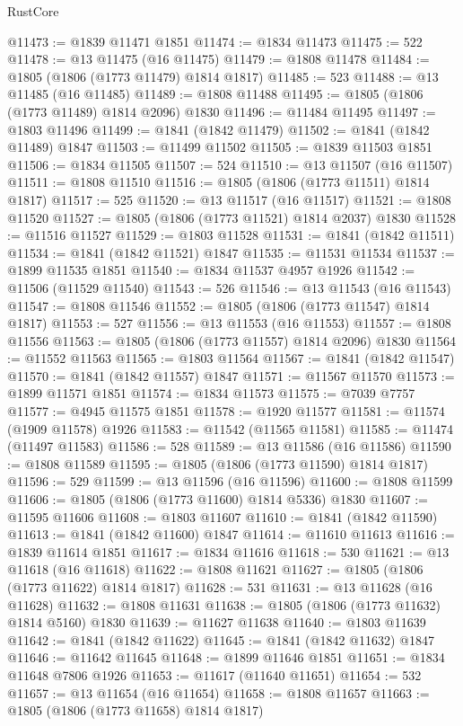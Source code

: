 \begin{lexlean}{RustCore}
\begin{coremodule}
@11473 := @1839 @11471 @1851
@11474 := @1834 @11473
@11475 := 522
@11478 := @13 @11475 (@16 @11475)
@11479 := @1808 @11478
@11484 := @1805 (@1806 (@1773 @11479) @1814 @1817)
@11485 := 523
@11488 := @13 @11485 (@16 @11485)
@11489 := @1808 @11488
@11495 := @1805 (@1806 (@1773 @11489) @1814 @2096) @1830
@11496 := @11484 @11495
@11497 := @1803 @11496
@11499 := @1841 (@1842 @11479)
@11502 := @1841 (@1842 @11489) @1847
@11503 := @11499 @11502
@11505 := @1839 @11503 @1851
@11506 := @1834 @11505
@11507 := 524
@11510 := @13 @11507 (@16 @11507)
@11511 := @1808 @11510
@11516 := @1805 (@1806 (@1773 @11511) @1814 @1817)
@11517 := 525
@11520 := @13 @11517 (@16 @11517)
@11521 := @1808 @11520
@11527 := @1805 (@1806 (@1773 @11521) @1814 @2037) @1830
@11528 := @11516 @11527
@11529 := @1803 @11528
@11531 := @1841 (@1842 @11511)
@11534 := @1841 (@1842 @11521) @1847
@11535 := @11531 @11534
@11537 := @1899 @11535 @1851
@11540 := @1834 @11537 @4957 @1926
@11542 := @11506 (@11529 @11540)
@11543 := 526
@11546 := @13 @11543 (@16 @11543)
@11547 := @1808 @11546
@11552 := @1805 (@1806 (@1773 @11547) @1814 @1817)
@11553 := 527
@11556 := @13 @11553 (@16 @11553)
@11557 := @1808 @11556
@11563 := @1805 (@1806 (@1773 @11557) @1814 @2096) @1830
@11564 := @11552 @11563
@11565 := @1803 @11564
@11567 := @1841 (@1842 @11547)
@11570 := @1841 (@1842 @11557) @1847
@11571 := @11567 @11570
@11573 := @1899 @11571 @1851
@11574 := @1834 @11573
@11575 := @7039 @7757
@11577 := @4945 @11575 @1851
@11578 := @1920 @11577
@11581 := @11574 (@1909 @11578) @1926
@11583 := @11542 (@11565 @11581)
@11585 := @11474 (@11497 @11583)
@11586 := 528
@11589 := @13 @11586 (@16 @11586)
@11590 := @1808 @11589
@11595 := @1805 (@1806 (@1773 @11590) @1814 @1817)
@11596 := 529
@11599 := @13 @11596 (@16 @11596)
@11600 := @1808 @11599
@11606 := @1805 (@1806 (@1773 @11600) @1814 @5336) @1830
@11607 := @11595 @11606
@11608 := @1803 @11607
@11610 := @1841 (@1842 @11590)
@11613 := @1841 (@1842 @11600) @1847
@11614 := @11610 @11613
@11616 := @1839 @11614 @1851
@11617 := @1834 @11616
@11618 := 530
@11621 := @13 @11618 (@16 @11618)
@11622 := @1808 @11621
@11627 := @1805 (@1806 (@1773 @11622) @1814 @1817)
@11628 := 531
@11631 := @13 @11628 (@16 @11628)
@11632 := @1808 @11631
@11638 := @1805 (@1806 (@1773 @11632) @1814 @5160) @1830
@11639 := @11627 @11638
@11640 := @1803 @11639
@11642 := @1841 (@1842 @11622)
@11645 := @1841 (@1842 @11632) @1847
@11646 := @11642 @11645
@11648 := @1899 @11646 @1851
@11651 := @1834 @11648 @7806 @1926
@11653 := @11617 (@11640 @11651)
@11654 := 532
@11657 := @13 @11654 (@16 @11654)
@11658 := @1808 @11657
@11663 := @1805 (@1806 (@1773 @11658) @1814 @1817)

\end{coremodule}
\end{lexlean}
